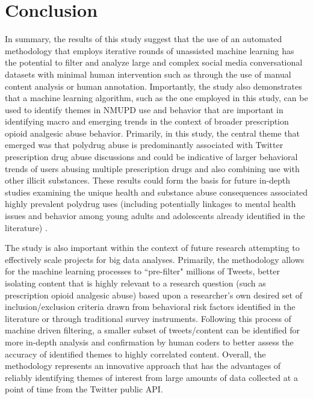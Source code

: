 \section{Conclusion}
In summary, the results of this study suggest that the use 
of an automated methodology that employs iterative rounds of 
unassisted machine learning has the potential to filter and 
analyze large and complex social media conversational datasets 
with minimal human intervention such as through the use of 
manual content analysis or human annotation. 
Importantly, the study also demonstrates that a machine 
learning algorithm, such as the one employed in this study, 
can be used to identify themes in NMUPD use and behavior that 
are important in identifying macro and emerging trends in the 
context of broader prescription opioid analgesic abuse behavior.
%
Primarily, in this study, the central theme that emerged was 
that polydrug abuse is predominantly associated with Twitter 
prescription drug abuse discussions and could be indicative 
of larger behavioral trends of users abusing multiple prescription 
drugs and also combining use with other illicit substances. 
These results could form the basis for future in-depth studies 
examining the unique health and substance abuse consequences 
associated highly prevalent polydrug uses (including potentially 
linkages to mental health issues and behavior among young adults 
and adolescents already identified in the literature)
\cite{mackesy2015prescription,kelly2014combinations,fink2015patterns}. 

The study is also important within the context of future research 
attempting to effectively scale projects for big data analyses. 
Primarily, the methodology allows for the machine learning processes to ``pre-filter" 
millions of Tweets, better isolating content that is highly relevant to 
a research question (such as prescription opioid analgesic abuse) based upon a 
researcher's own desired set of inclusion/exclusion criteria drawn from 
behavioral risk factors identified in the literature or through traditional 
survey instruments. Following this process of machine driven filtering, 
a smaller subset of tweets/content can be identified for more 
in-depth analysis and confirmation by human coders to better assess 
the accuracy of identified themes to highly correlated content. 
Overall, the methodology represents an innovative approach that has 
the advantages of reliably identifying themes of interest from 
large amounts of data collected at a point of time from the 
Twitter public API.
%
